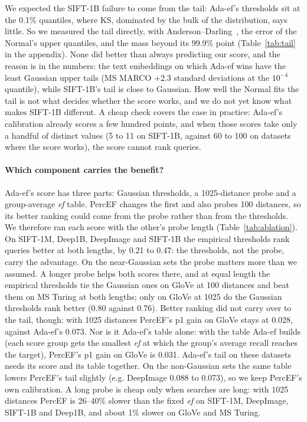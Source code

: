 \documentclass[sigconf,review=false,screen]{acmart}
\newcommand{\ef}{\textit{ef}}
\begin{document}
We expected the SIFT-1B failure to come from the tail: Ada-ef's thresholds sit at the 0.1\%
quantiles, where KS, dominated by the bulk of the distribution, says little. So we measured the tail
directly, with Anderson--Darling~\cite{anderson1952}, the error of the Normal's upper quantiles, and
the mass beyond its 99.9\% point (Table~\ref{tab:tail} in the appendix). None did better than
always predicting our score, and the reason is in the numbers: the text embeddings on which Ada-ef
wins have the least Gaussian upper tails (MS MARCO $+$2.3 standard deviations at the $10^{-4}$
quantile), while SIFT-1B's tail is close to Gaussian. How well the Normal fits the tail is not what
decides whether the score works, and we do not yet know what makes SIFT-1B different. A cheap
check covers the case in practice: Ada-ef's calibration already scores a few hundred points, and
when those scores take only a handful of distinct values (5 to 11 on SIFT-1B, against 60 to 100 on
datasets where the score works), the score cannot rank queries.

\paragraph{Which component carries the benefit?}\label{sec:ablation}
Ada-ef's score has three parts: Gaussian thresholds, a 1025-distance probe and a group-average \ef{}
table. PercEF changes the first and also probes 100 distances, so its better ranking could come from
the probe rather than from the thresholds. We therefore ran each score with the other's probe length
(Table~\ref{tab:ablation}). On SIFT-1M, Deep1B, DeepImage and SIFT-1B the empirical thresholds rank
queries better at both lengths, by 0.21 to 0.47: the thresholds, not the probe, carry the
advantage. On the near-Gaussian sets the probe matters more than we assumed. A longer probe helps
both scores there, and at equal length the empirical thresholds tie the Gaussian ones on GloVe at
100 distances and beat them on MS Turing at both lengths; only on GloVe at 1025 do the Gaussian
thresholds rank better (0.80 against 0.76). Better ranking did not carry over to the tail, though:
with 1025 distances PercEF's p1 gain on GloVe stays at 0.028, against Ada-ef's 0.073. Nor is it
Ada-ef's table alone: with the table Ada-ef builds (each score group gets the smallest \ef{} at which
the group's average recall reaches the target), PercEF's p1 gain on GloVe is 0.031. Ada-ef's tail
on these datasets needs its score and its table together. On the non-Gaussian sets the same table
lowers PercEF's tail slightly (e.g. DeepImage 0.088 to 0.073), so we keep PercEF's own calibration. A long probe is cheap only when searches are long: with 1025 distances
PercEF is 26--40\% slower than the fixed \ef{} on SIFT-1M, DeepImage, SIFT-1B and Deep1B, and about
1\% slower on GloVe and MS Turing.
\end{document}
